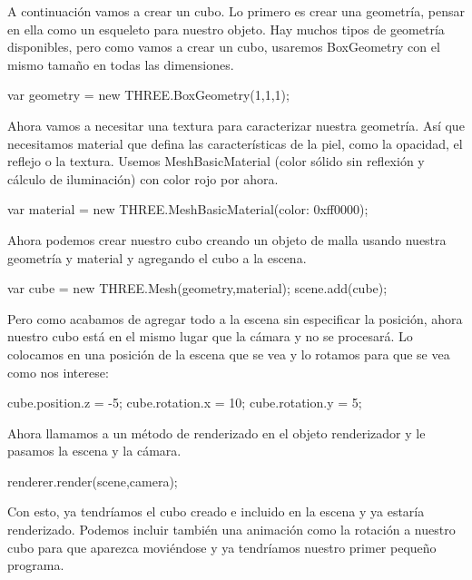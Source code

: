 \documentclass[a4paper, 12pt]{book}
\begin{document}
A continuación vamos a crear un cubo.
Lo primero es crear una geometría, pensar en ella como un esqueleto para nuestro objeto. Hay muchos tipos de geometría disponibles, pero como vamos a crear un cubo, usaremos BoxGeometry con el mismo tamaño en todas las dimensiones.

\begin{center}
var geometry = new THREE.BoxGeometry(1,1,1);
\end{center}

Ahora vamos a necesitar una textura para caracterizar nuestra geometría. Así que necesitamos material que defina las características de la piel, como la opacidad, el reflejo o la textura. Usemos MeshBasicMaterial (color sólido sin reflexión y cálculo de iluminación) con color rojo por ahora.
\begin{center}
var material = new THREE.MeshBasicMaterial({color: 0xff0000});
\end{center}
Ahora podemos crear nuestro cubo creando un objeto de malla usando nuestra geometría y material y agregando el cubo a la escena.
\begin{center}
var cube = new THREE.Mesh(geometry,material);
scene.add(cube);

\end{center}
Pero como acabamos de agregar todo a la escena sin especificar la posición, ahora nuestro cubo está en el mismo lugar que la cámara y no se procesará. Lo colocamos en una posición de la escena que se vea y lo rotamos para que se vea como nos interese:

\begin{center}
cube.position.z = -5;
cube.rotation.x = 10;
cube.rotation.y = 5;
\end{center}

Ahora llamamos a un método de renderizado en el objeto renderizador y le pasamos la escena y la cámara.
\begin{center}
renderer.render(scene,camera);
\end{center}

Con esto, ya tendríamos el cubo creado e incluido en la escena y ya estaría renderizado. Podemos incluir también una animación como la rotación a nuestro cubo para que aparezca moviéndose y ya tendríamos nuestro primer pequeño programa.
\end{document}
